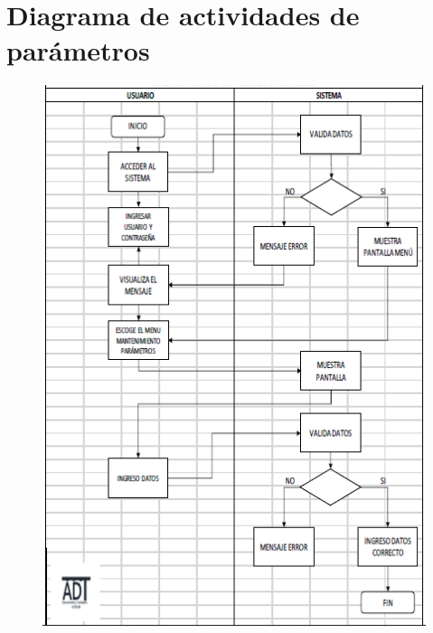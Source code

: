 \documentclass[12pt,a4paper]{article}
\begin{document}
\section*{Diagrama de actividades de parámetros}
\begin{figure}[hbtp]
\caption{}
\centering
\includegraphics[scale=0.5]{DUODECIMA.png}
\end{figure}
\end{document}
